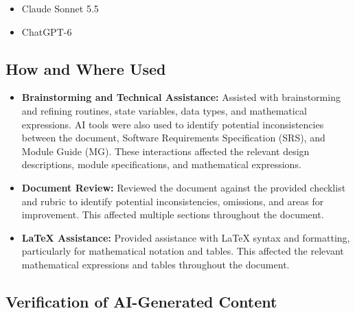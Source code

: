 \documentclass[12pt, titlepage]{article}
\begin{document}

\begin{itemize}
    \item Claude Sonnet 5.5
    \item ChatGPT-6
\end{itemize}

\subsection{How and Where Used}




\begin{itemize}
    \item \textbf{Brainstorming and Technical Assistance:} Assisted with brainstorming and refining routines, state variables, data types, and
    mathematical expressions. AI tools were also used to identify potential inconsistencies
    between the document, Software Requirements Specification (SRS), and Module Guide (MG).
    These interactions affected the relevant design descriptions, module specifications, and
    mathematical expressions.
    \item \textbf{Document Review:} Reviewed the document against the provided checklist and rubric to identify potential inconsistencies,
    omissions, and areas for improvement. This affected multiple sections throughout the document.
    \item \textbf{LaTeX Assistance:} Provided assistance with LaTeX syntax and formatting, particularly for mathematical notation and tables.
    This affected the relevant mathematical expressions and tables throughout the document.
\end{itemize}

\subsection{Verification of AI-Generated Content}
\end{document}
